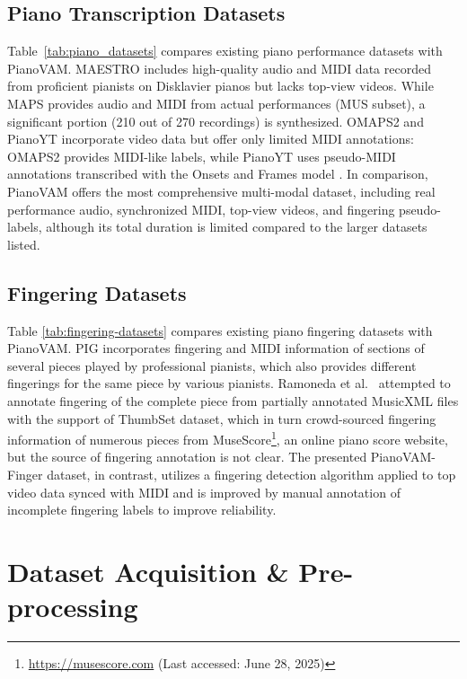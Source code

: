\documentclass{article}
\begin{document}
\subsection{Piano Transcription Datasets}
Table~\ref{tab:piano_datasets} compares existing piano performance datasets with PianoVAM. MAESTRO \cite{ICLR19Hawthorne} includes high-quality audio and MIDI data recorded from proficient pianists on Disklavier pianos but lacks top-view videos. While MAPS \cite{Emiya2010} provides audio and MIDI from actual performances (MUS subset), a significant portion (210 out of 270 recordings) is synthesized. OMAPS2 \cite{ICASSPW23Li} and PianoYT \cite{ICASSP20Koepke} incorporate video data but offer only limited MIDI annotations: OMAPS2 provides MIDI-like labels, while PianoYT uses pseudo-MIDI annotations transcribed with the Onsets and Frames model \cite{ISMIR18Hawthorne}. In comparison, PianoVAM offers the most comprehensive multi-modal dataset, including real performance audio, synchronized MIDI, top-view videos, and fingering pseudo-labels, although its total duration is limited compared to the larger datasets listed.


\subsection{Fingering Datasets}
Table \ref{tab:fingering-datasets} compares existing piano fingering datasets with PianoVAM. PIG \cite{InfoSci20Nakamura} incorporates fingering and MIDI information of sections of several pieces played by professional pianists, which also provides different fingerings for the same piece by various pianists. Ramoneda et al.~\cite{MM22Ramoneda} attempted to annotate fingering of the complete piece from partially annotated MusicXML files with the support of ThumbSet dataset, which in turn crowd-sourced fingering information of numerous pieces from MuseScore\footnote{\href{https://musescore.com}{https://musescore.com} (Last accessed: June 28, 2025)}, an online piano score website, but the source of fingering annotation is not clear. The presented PianoVAM-Finger dataset, in contrast, utilizes a fingering detection algorithm  applied to top video data synced with MIDI and is improved by manual annotation of incomplete fingering labels to improve reliability.  

\section{Dataset Acquisition \& Pre-processing}\label{sec:dataset-acquisition-preprocessing}
\end{document}
